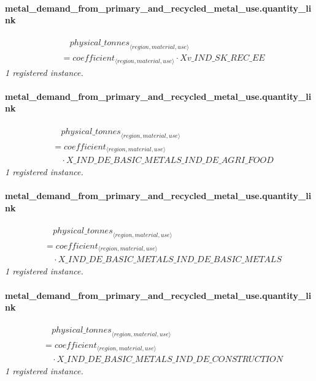 \documentclass[11pt]{article}
\begin{document}
\paragraph{metal\_demand\_from\_primary\_and\_recycled\_metal\_use.quantity\_link}
\begin{align*}
&\quad {physical\_tonnes}_{\langle region, material, use\rangle}\\
&= coefficient_{\langle region, material, use\rangle} \cdot Xv\_IND\_SK\_REC\_EE
\end{align*}
\noindent\emph{1 registered instance.}\par
\paragraph{metal\_demand\_from\_primary\_and\_recycled\_metal\_use.quantity\_link}
\begin{align*}
&\quad {physical\_tonnes}_{\langle region, material, use\rangle}\\
&= coefficient_{\langle region, material, use\rangle}\\
&\quad {}\cdot X\_IND\_DE\_BASIC\_METALS\_IND\_DE\_AGRI\_FOOD
\end{align*}
\noindent\emph{1 registered instance.}\par
\paragraph{metal\_demand\_from\_primary\_and\_recycled\_metal\_use.quantity\_link}
\begin{align*}
&\quad {physical\_tonnes}_{\langle region, material, use\rangle}\\
&= coefficient_{\langle region, material, use\rangle}\\
&\quad {}\cdot X\_IND\_DE\_BASIC\_METALS\_IND\_DE\_BASIC\_METALS
\end{align*}
\noindent\emph{1 registered instance.}\par
\paragraph{metal\_demand\_from\_primary\_and\_recycled\_metal\_use.quantity\_link}
\begin{align*}
&\quad {physical\_tonnes}_{\langle region, material, use\rangle}\\
&= coefficient_{\langle region, material, use\rangle}\\
&\quad {}\cdot X\_IND\_DE\_BASIC\_METALS\_IND\_DE\_CONSTRUCTION
\end{align*}
\noindent\emph{1 registered instance.}\par
\end{document}
